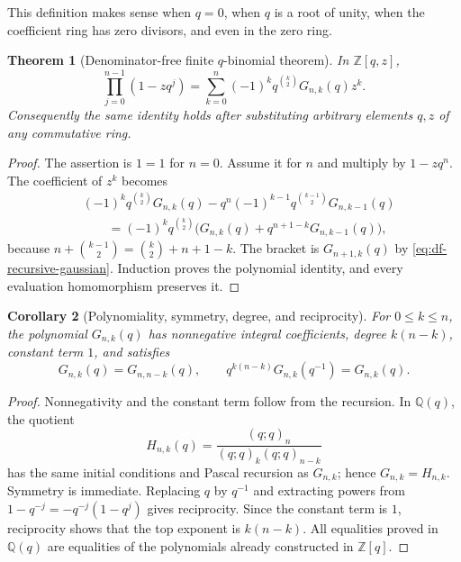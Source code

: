 \documentclass[11pt,oneside,openany]{book}
\newtheorem{theorem}{Theorem}[chapter]
\newtheorem{corollary}[theorem]{Corollary}
\theoremstyle{definition}
\theoremstyle{remark}
\newcommand{\Q}{\mathbb Q}
\newcommand{\Z}{\mathbb Z}
\begin{document}
This definition makes sense when $q=0$, when $q$ is a root of unity, when the
coefficient ring has zero divisors, and even in the zero ring.

\begin{theorem}[Denominator-free finite $q$-binomial theorem]
\label{thm:df-finite-q-binomial}
In $\Z[q,z]$,
\begin{equation}
 \prod_{j=0}^{n-1}(1-zq^j)
 =\sum_{k=0}^{n}(-1)^kq^{\binom{k}{2}}G_{n,k}(q)z^k.
 \label{eq:df-finite-q-binomial}
\end{equation}
Consequently the same identity holds after substituting arbitrary elements
$q,z$ of any commutative ring.
\end{theorem}

\begin{proof}
The assertion is $1=1$ for $n=0$.  Assume it for $n$ and multiply by
$1-zq^n$.  The coefficient of $z^k$ becomes
\begin{align*}
 &(-1)^kq^{\binom{k}{2}}G_{n,k}(q)
 -q^n(-1)^{k-1}q^{\binom{k-1}{2}}G_{n,k-1}(q)\\
 &\qquad=(-1)^kq^{\binom{k}{2}}
 \bigl(G_{n,k}(q)+q^{n+1-k}G_{n,k-1}(q)\bigr),
\end{align*}
because $n+\binom{k-1}{2}=\binom{k}{2}+n+1-k$.  The bracket is
$G_{n+1,k}(q)$ by \eqref{eq:df-recursive-gaussian}.  Induction proves the
polynomial identity, and every evaluation homomorphism preserves it.
\end{proof}

\begin{corollary}[Polynomiality, symmetry, degree, and reciprocity]
\label{cor:df-gaussian-properties}
For $0\le k\le n$, the polynomial $G_{n,k}(q)$ has nonnegative integral
coefficients, degree $k(n-k)$, constant term $1$, and satisfies
\begin{equation}
 G_{n,k}(q)=G_{n,n-k}(q),
 \qquad
 q^{k(n-k)}G_{n,k}(q^{-1})=G_{n,k}(q).
 \label{eq:df-gaussian-reciprocity}
\end{equation}
\end{corollary}

\begin{proof}
Nonnegativity and the constant term follow from the recursion.  In $\Q(q)$,
the quotient
\[
 H_{n,k}(q)=\frac{(q;q)_n}{(q;q)_k(q;q)_{n-k}}
\]
has the same initial conditions and Pascal recursion as $G_{n,k}$; hence
$G_{n,k}=H_{n,k}$.  Symmetry is immediate.  Replacing $q$ by $q^{-1}$ and
extracting powers from $1-q^{-j}=-q^{-j}(1-q^j)$ gives reciprocity.  Since the
constant term is $1$, reciprocity shows that the top exponent is $k(n-k)$.
All equalities proved in $\Q(q)$ are equalities of the polynomials already
constructed in $\Z[q]$.
\end{proof}
\end{document}
